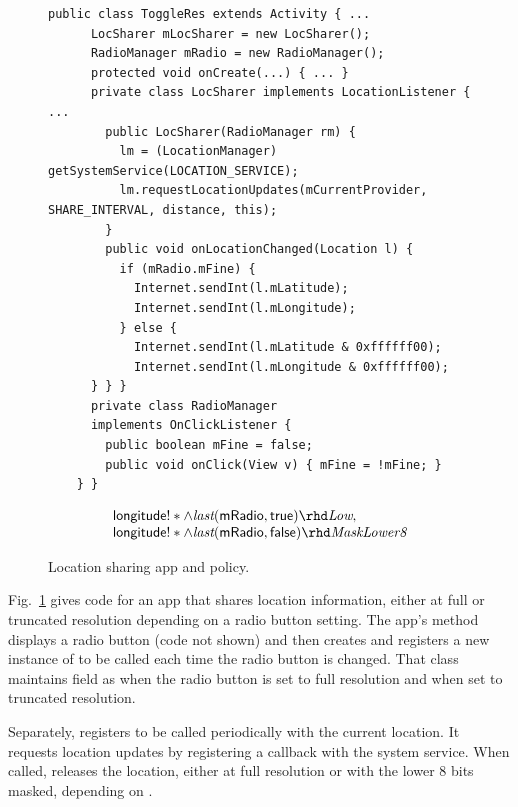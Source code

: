 \begin{figure}[t]
  \centering
  \begin{lstlisting}[name=Ex]
    public class ToggleRes extends Activity { ...
      LocSharer mLocSharer = new LocSharer();
      RadioManager mRadio = new RadioManager();
      protected void onCreate(...) { ... }
      private class LocSharer implements LocationListener { ... 
        public LocSharer(RadioManager rm) {
          lm = (LocationManager) getSystemService(LOCATION_SERVICE);
          lm.requestLocationUpdates(mCurrentProvider, SHARE_INTERVAL, distance, this);
        }
        public void onLocationChanged(Location l) {
          if (mRadio.mFine) {
            Internet.sendInt(l.mLatitude);
            Internet.sendInt(l.mLongitude);
          } else {
            Internet.sendInt(l.mLatitude & 0xffffff00);
            Internet.sendInt(l.mLongitude & 0xffffff00);
      } } }
      private class RadioManager
      implements OnClickListener {
        public boolean mFine = false;
        public void onClick(View v) { mFine = !mFine; }
    } }
  \end{lstlisting}
  \begin{displaymath}
    \begin{array}{ll}
      \code{longitude}!\ast \wedge
      \tlast{\code{mRadio}}{\code{true}} \rhd
      \textit{Low}, \\
      \code{longitude}!\ast \wedge
      \tlast{\code{mRadio}}{\code{false}} \rhd
      \textit{MaskLower8}
    \end{array}
  \end{displaymath}
  \caption{Location sharing app and policy.}
  \label{fig:app-loc-toggle}
\end{figure}

Fig.~\ref{fig:app-loc-toggle} gives code for an app that
shares location information, either at full or truncated resolution
depending on a radio button setting. The app's 
method displays a radio button (code not shown) and then creates and
registers a new instance of  to be called
each time the radio button is changed. That
class maintains field  as  when the radio button is
set to full resolution and  when set to truncated
resolution.

Separately,  registers  to be called
periodically with the current location.  It requests location updates
by registering a callback with the 
system service.  When called,  releases the
location, either at full resolution or with the lower 8 bits
masked, depending on .


